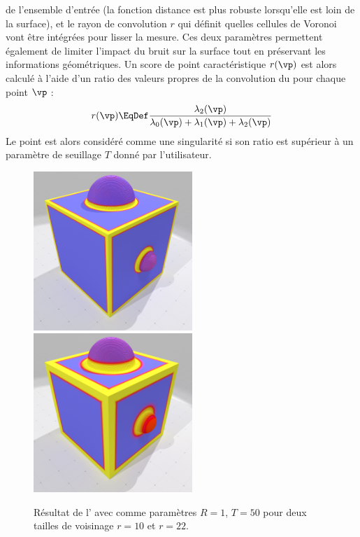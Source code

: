 de l'ensemble d'entrée (la fonction distance est plus robuste lorsqu'elle est
loin de la surface), et le rayon de convolution $r$ qui définit quelles cellules
de Voronoi vont être intégrées pour lisser la mesure. Ces deux paramètres
permettent également de limiter l'impact du bruit sur la surface tout en
préservant les informations géométriques. Un score de point caractéristique
$r(\vp)$ est alors calculé à l'aide d'un ratio des valeurs propres de la
convolution du \VCM pour chaque point $\vp$ :
%
\begin{equation}
  r(\vp) \EqDef \frac{\lambda_2(\vp)}{\lambda_0(\vp) + \lambda_1(\vp) + \lambda_2(\vp)}
  \label{eq:VCM-ratio-eigenvalues}
\end{equation}
%
Le point est alors considéré comme une singularité si son ratio est supérieur à
un paramètre de seuillage $T$ donné par l'utilisateur.
%
\begin{figure}[ht]
  \centering
  \includegraphics[height=6cm]{images/Feature/CubeSphere_VCM_r_10}
  \includegraphics[height=6cm]{images/Feature/CubeSphere_VCM_r_22}
  \caption[Résultat de l']{Résultat de l' avec comme paramètres $R = 1$, $T = 50$ pour deux tailles de voisinage $r = 10$ et $r = 22$.}\label{fig:VCM-cubesphere}
\end{figure}
%
